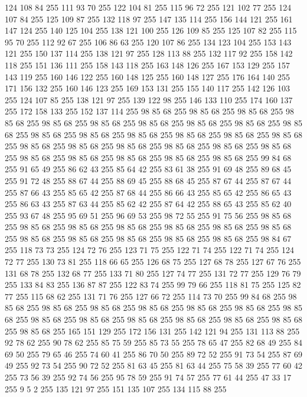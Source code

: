 124 108 84 255 111 93 70 255 122 104 81 255 115 96 72 255 121 102 77 255 124 107 84 255 125 109 87 255 132 118 97 255 147 135 114 255 156 144 121 255 161 147 124 255 140 125 104 255 138 121 100 255 126 109 85 255 125 107 82 255 115 95 70 255 112 92 67 255 106 86 63 255 120 107 86 255 134 123 104 255 153 143 121 255 150 137 114 255 138 121 97 255 128 113 88 255 132 117 92 255 158 142 118 255 151 136 111 255 158 143 118 255 163 148 126 255 167 153 129 255 157 143 119 255 160 146 122 255 160 148 125 255 160 148 127 255 176 164 140 255 171 156 132 255 160 146 123 255 169 153 131 255 155 140 117 255 142 126 103 255 124 107 85 255 138 121 97 255 139 122 98 255 146 133 110 255 174 160 137 255 172 158 133 255 152 137 114 255 98 85 68 255 98 85 68 255 98 85 68 255 98 85 68 255 98 85 68 255 98 85 68 255 98 85 68 255 98 85 68 255 98 85 68 255 98 85 68 255 98 85 68 255 98 85 68 255 98 85 68 255 98 85 68 255 98 85 68 255 98 85 68 255 98 85 68 255
98 85 68 255 98 85 68 255 98 85 68 255 98 85 68 255 98 85 68 255 98 85 68 255 98 85 68 255 98 85 68 255 98 85 68 255 98 85 68 255 99 84 68 255 91 65 49 255 86 62 43 255 85 64 42 255 83 61 38 255 91 69 48 255 89 68 45 255 91 72 48 255 88 67 44 255 88 69 45 255 88 68 45 255 87 67 44 255 87 67 44 255 87 66 43 255 85 65 42 255 87 68 44 255 86 66 43 255 85 65 42 255 86 65 43 255 86 63 43 255 87 63 44 255 85 62 42 255 87 64 42 255 88 65 43 255 85 62 40 255 93 67 48 255 95 69 51 255 96 69 53 255 98 72 55 255 91 75 56 255 98 85 68 255 98 85 68 255 98 85 68 255 98 85 68 255 98 85 68 255 98 85 68 255 98 85 68 255 98 85 68 255 98 85 68 255 98 85 68 255 98 85 68 255 98 85 68 255 98 84 67 255 118 73 73 255 124 72 76 255 123 71 75 255 122 71 74 255 122 71 74 255 124 72 77 255 130 73 81 255 118 66 65 255 126 68 75 255 127 68 78 255 127 67 76 255
131 68 78 255 132 68 77 255 133 71 80 255 127 74 77 255 131 72 77 255 129 76 79 255 133 84 83 255 136 87 87 255 122 83 74 255 99 79 66 255 118 81 75 255 125 82 77 255 115 68 62 255 131 71 76 255 127 66 72 255 114 73 70 255 99 84 68 255 98 85 68 255 98 85 68 255 98 85 68 255 98 85 68 255 98 85 68 255 98 85 68 255 98 85 68 255 98 85 68 255 98 85 68 255 98 85 68 255 98 85 68 255 98 85 68 255 98 85 68 255 98 85 68 255 165 151 129 255 172 156 131 255 142 121 94 255 131 113 88 255 92 78 62 255 90 78 62 255 85 75 59 255 85 73 55 255 78 65 47 255 82 68 49 255 84 69 50 255 79 65 46 255 74 60 41 255 86 70 50 255 89 72 52 255 91 73 54 255 87 69 49 255 92 73 54 255 90 72 52 255 81 63 45 255 81 63 44 255 75 58 39 255 77 60 42 255 73 56 39 255 92 74 56 255 95 78 59 255 91 74 57 255 77 61 44 255 47 33 17 255 9 5 2 255 135 121 97 255 151 135 107 255 134 115 88 255
